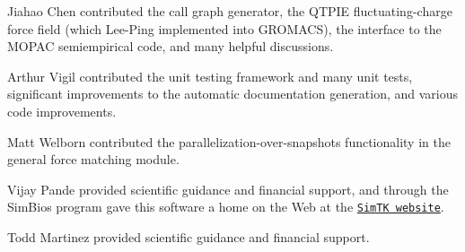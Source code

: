 \begin{DoxyItemize}
\item Jiahao Chen contributed the call graph generator, the Q\-T\-P\-I\-E fluctuating-\/charge force field (which Lee-\/\-Ping implemented into G\-R\-O\-M\-A\-C\-S), the interface to the M\-O\-P\-A\-C semiempirical code, and many helpful discussions.
\end{DoxyItemize}


\begin{DoxyItemize}
\item Arthur Vigil contributed the unit testing framework and many unit tests, significant improvements to the automatic documentation generation, and various code improvements.
\end{DoxyItemize}


\begin{DoxyItemize}
\item Matt Welborn contributed the parallelization-\/over-\/snapshots functionality in the general force matching module.
\end{DoxyItemize}


\begin{DoxyItemize}
\item Vijay Pande provided scientific guidance and financial support, and through the Sim\-Bios program gave this software a home on the Web at the \href{https://simtk.org/home/forcebalance/}{\tt Sim\-T\-K website}.
\end{DoxyItemize}


\begin{DoxyItemize}
\item Todd Martinez provided scientific guidance and financial support. 
\end{DoxyItemize}
